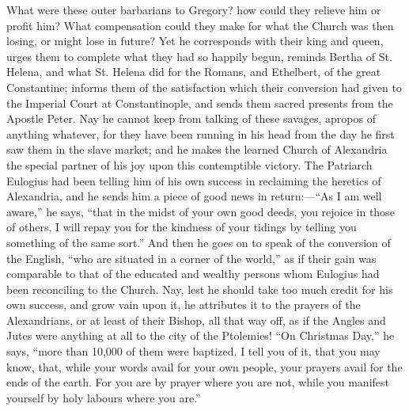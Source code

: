 What were these outer barbarians to Gregory? how could they relieve
him or profit him? What compensation could they make for what the
Church was then losing, or might lose in future? Yet he corresponds
with their king and queen, urges them to complete what they had so
happily begun, reminds Bertha of St. Helena, and what St. Helena did
for the Romans, and Ethelbert, of the great Constantine; informs them
of the satisfaction which their conversion had given to the Imperial
Court at Constantinople, and sends them sacred presents from the
Apostle Peter. Nay he cannot keep from talking of these savages,
apropos of anything whatever, for they have been running in his head
from the day he first saw them in the slave market; and he makes the
learned Church of Alexandria the special partner of his joy upon this
contemptible victory. The Patriarch Eulogius had been telling him of
his own success in reclaiming the heretics of Alexandria, and he sends
him a piece of good news in return:—``As I am well aware,''
he says, ``that in the midst of your own good deeds, you rejoice
in those of others, I will repay you for the kindness of your tidings
by telling you something of the same sort.'' And then he goes on
to speak of the conversion of the English, ``who are situated in a
corner of the world,'' as if their gain was comparable to that of
the educated and wealthy persons whom Eulogius had been
reconciling to the Church. Nay, lest he should take too much credit
for his own success, and grow vain upon it, he attributes it to the
prayers of the Alexandrians, or at least of their Bishop, all that way
off, as if the Angles and Jutes were anything at all to the city of
the Ptolemies! ``On Christmas Day,'' he says, ``more than
10,000 of them were baptized. I tell you of it, that you may know,
that, while your words avail for your own people, your prayers avail
for the ends of the earth. For you are by prayer where you are not,
while you manifest yourself by holy labours where you are.''

